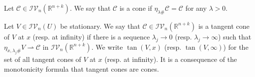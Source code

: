 \documentclass[11pt]{amsart}
\newtheorem{theorem}{Theorem}[section]
\theoremstyle{definition}
\newcommand{\R}{\mathbb{R}}
\newcommand{\C}{\mathcal{C}}
\newcommand{\IV}{\mathcal{IV}}
\DeclareMathOperator{\spt}{spt}
\DeclareMathOperator{\graph}{graph}
\begin{document}
	Let $\C\in \IV_n(\R^{n+k})$. We say that $\C$ is a cone if $\eta_{\lambda\#}\C=\C$ for any $\lambda>0$.
	
	Let $V\in \IV_n(U)$ be stationary. We say that $\C\in \IV_n(\R^{n+k})$ is a tangent cone of $V$ at $x$ (resp. at infinity) if there is a sequence $\lambda_j\to0$ (resp. $\lambda_j\to \infty$) such that $\eta_{x,\lambda_{j}\#}V\rightharpoonup \C$ in $\IV_n(\R^{n+k})$. We write $\tan(V,x)$ (resp. $\tan(V,\infty)$) for the set of all tangent cones of $V$ at $x$ (resp. at infinity). It is a consequence of the monotonicity formula \cite[17.5]{Sim} that tangent cones are cones.
\end{document}
